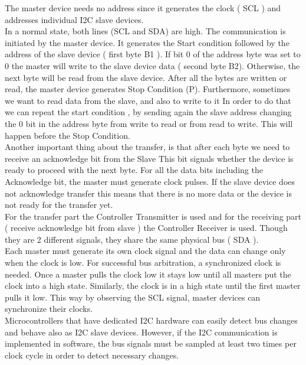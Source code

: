 \documentclass[l2pt, letterpaper]{article}
\begin{document}
The master device needs no address since it generates the clock ( SCL ) and
addresses individual I2C slave devices.\\

In a normal state, both lines (SCL and SDA) are high. The communication is
initiated by the master device. It generates the Start condition followed by the
address of the slave device ( first byte B1 ). If bit 0 of the address byte was set to
0 the master will write to the slave device data ( second byte B2). Otherwise, the
next byte will be read from the slave device. After all the bytes are written or
read, the master device generates Stop Condition (P). Furthermore, sometimes
we want to read data from the slave, and also to write to it In order to do that we
can repeat the start condition , by sending again the slave address changing the
0 bit in the address byte from write to read or from read to write. This will
happen before the Stop Condition.\\

Another important thing about the transfer, is that after each byte we need to
receive an acknowledge bit from the Slave This bit signals whether the device is
ready to proceed with the next byte. For all the data bits including the
Acknowledge bit, the master must generate clock pulses. If the slave device does
not acknowledge transfer this means that there is no more data or the device is
not ready for the transfer yet.\\

For the transfer part the Controller Transmitter is used and for the receiving part
( receive acknowledge bit from slave ) the Controller Receiver is used. Though
they are 2 different signals, they share the same physical bus ( SDA ).\\

Each master must generate its own clock signal and the data can change only
when the clock is low. For successful bus arbitration, a synchronized clock is
needed. Once a master pulls the clock low it stays low until all masters put the
clock into a high state. Similarly, the clock is in a high state until the first master
pulls it low. This way by observing the SCL signal, master devices can
synchronize their clocks.\\

Microcontrollers that have dedicated I2C hardware can easily detect bus changes
and behave also as I2C slave devices. However, if the I2C communication is
implemented in software, the bus signals must be sampled at least two times per
clock cycle in order to detect necessary changes.\\
\end{document}
